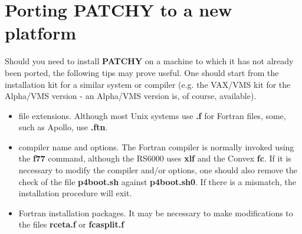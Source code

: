 \section{Porting {\bf PATCHY} to a new platform}
 
Should you need to install {\bf PATCHY} on a machine to which
it has not already been ported, the following tips may prove
useful. One should start from the installation kit for a similar
system or compiler (e.g. the VAX/VMS kit for the Alpha/VMS
version - an Alpha/VMS version is, of course, available).

\begin{itemize}
\item
file extensions. Although most Unix systems use {\bf .f} for Fortran files,
some, such as Apollo, use {\bf .ftn}.
\item
compiler name and options. The Fortran compiler
is normally invoked using the {\bf f77} command, although
the RS6000 uses {\bf xlf} and the Convex {\bf fc}.
If it is necessary to modify the compiler and/or options, one
should also remove the check of the file {\bf p4boot.sh} against
{\bf p4boot.sh0}. If there is a mismatch, the installation procedure
will exit.
\item
Fortran installation packages. It may be necessary to make modifications
to the files {\bf rceta.f} or {\bf fcasplit.f}
\end{itemize}
